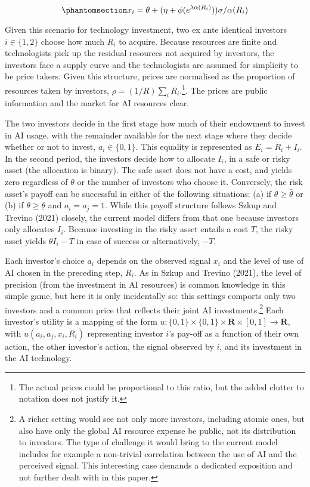 \documentclass[
]{article}
\theoremstyle{plain}
\theoremstyle{remark}
\begin{document}
\begin{equation}\phantomsection\label{eq-privatesignals}{
x_i = \theta + (\eta + \phi(e^{\lambda \alpha(R_i)})) \sigma / \alpha(R_i)
}\end{equation}

Given this scenario for technology investment, two ex ante identical
investors \(i \in \{1,2\}\) choose how much \(R_i\) to acquire. Because
resources are finite and technologists pick up the residual resources
not acquired by investors, the investors face a supply curve and the
technologists are assumed for simplicity to be price takers. Given this
structure, prices are normalised as the proportion of resources taken by
investors, \(\rho = (1/R)\sum_i R_i\).\footnote{The actual prices could
  be proportional to this ratio, but the added clutter to notation does
  not justify it.}. The prices are public information and the market for
AI resources clear.

The two investors decide in the first stage how much of their endowment
to invest in AI usage, with the remainder available for the next stage
where they decide whether or not to invest, \(a_i \in \{0, 1\}\). This
equality is represented as \(E_i = R_i + I_i\). In the second period,
the investors decide how to allocate \(I_i\), in a safe or risky asset
(the allocation is binary). The safe asset does not have a cost, and
yields zero regardless of \(\theta\) or the number of investors who
choose it. Conversely, the risk asset's payoff can be successful in
either of the following situations: (a) if \(\theta \geq \bar{\theta}\)
or (b) if \(\theta \geq \underline{\theta}\) and \(a_i = a_j = 1\).
While this payoff structure follows Szkup and Trevino (2021) closely,
the current model differs from that one because investors only allocates
\(I_i\). Because investing in the risky asset entails a cost \(T\), the
risky asset yields \(\theta I_i - T\) in case of success or
alternatively, \(-T\).

Each investor's choice \(a_i\) depends on the observed signal \(x_i\)
and the level of use of AI chosen in the preceding step, \(R_i\). As in
Szkup and Trevino (2021), the level of precision (from the investment in
AI resources) is common knowledge in this simple game, but here it is
only incidentally so: this settings comports only two investors and a
common price that reflects their joint AI investments.\footnote{A richer
  setting would see not only more investors, including atomic ones, but
  also have only the global AI resource expense be public, not its
  distribution to investors. The type of challenge it would bring to the
  current model includes for example a non-trivial correlation between
  the use of AI and the perceived signal. This interesting case demands
  a dedicated exposition and not further dealt with in this paper.} Each
investor's utility is a mapping of the form
\(u : \{0, 1\} \times \{0, 1\} \times \mathbf{R} \times [0, 1] \to \mathbf{R}\),
with \(u(a_i, a_j, x_i, R_i)\) representing investor \(i\)'s pay-off as
a function of their own action, the other investor's action, the signal
observed by \(i\), and its investment in the AI technology.
\end{document}
